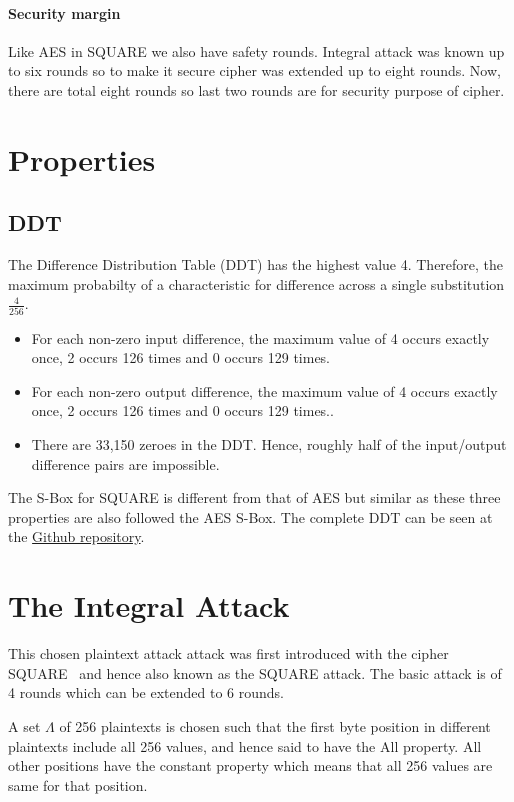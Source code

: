 \documentclass[preprint]{transcrypto}
\begin{document}
\paragraph{Security margin\\}
Like AES in SQUARE we also have safety rounds. Integral attack was known up to six rounds so to make it secure cipher was extended up to eight rounds. Now, there are total eight rounds so last two rounds are for security purpose of cipher.

\section{Properties}
\subsection{DDT}
The Difference Distribution Table (DDT) has the highest value 4. Therefore, the maximum probabilty of a characteristic for difference across a single substitution $\frac{4}{256}$.

\begin{itemize}
  \item For each non-zero input difference, the maximum value of 4 occurs exactly once, 2 occurs 126 times and 0 occurs 129 times.
  \item For each non-zero output difference, the maximum value of 4 occurs exactly once, 2 occurs 126 times and 0 occurs 129 times..
  \item There are 33,150 zeroes in the DDT. Hence, roughly half of the input/output difference pairs are impossible.
\end{itemize}

The S-Box for SQUARE is different from that of AES but similar as these three properties are also followed the AES S-Box. The complete DDT can be seen at the \href{https://github.com/supercoww/square-term-paper/blob/master/code/scripts/ddt.txt}{Github repository}.

\section{The Integral Attack}
This chosen plaintext attack attack was first introduced with the cipher SQUARE~\cite{FSE:DaeKnuRij97} and hence also known as the SQUARE attack. The basic attack is of 4 rounds which can be extended to 6 rounds.

A set $\Lambda$ of 256 plaintexts is chosen such that the first byte position in different plaintexts include all 256 values, and hence said to have the All property. All other positions have the constant property which means that all 256 values are same for that position.
\end{document}
